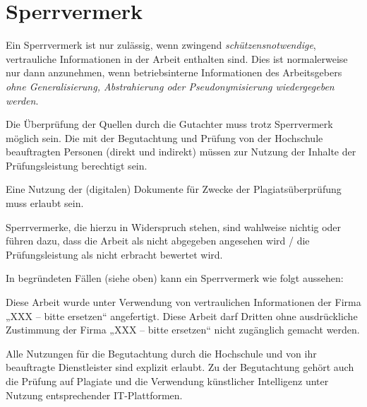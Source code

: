 %
%
\section*{Sperrvermerk}

Ein Sperrvermerk ist nur zulässig, wenn zwingend \emph{schützensnotwendige}, vertrauliche Informationen in der Arbeit enthalten sind. Dies ist normalerweise nur dann anzunehmen, wenn betriebsinterne Informationen des Arbeitsgebers \emph{ohne Generalisierung, Abstrahierung oder Pseudonymisierung wiedergegeben werden}.

Die Überprüfung der Quellen durch die Gutachter muss trotz Sperrvermerk möglich sein. Die mit der Begutachtung und Prüfung von der Hochschule beauftragten Personen (direkt und indirekt) müssen zur Nutzung der Inhalte der Prüfungsleistung berechtigt sein.

Eine Nutzung der (digitalen) Dokumente für Zwecke der Plagiatsüberprüfung muss erlaubt sein.

Sperrvermerke, die hierzu in Widerspruch stehen, sind wahlweise nichtig oder führen dazu, dass die Arbeit als nicht abgegeben angesehen wird / die Prüfungs\-leistung als nicht erbracht bewertet wird.

In begründeten Fällen (siehe oben) kann ein Sperrvermerk wie folgt aussehen:

Diese Arbeit wurde unter Verwendung von vertraulichen Informationen der Firma „XXX – bitte ersetzen“ angefertigt. Diese Arbeit darf Dritten ohne ausdrückliche Zustimmung der Firma „XXX – bitte ersetzen“ nicht zugänglich gemacht werden. 

Alle Nutzungen für die Begutachtung durch die Hochschule und von ihr beauftragte Dienstleister sind explizit erlaubt. Zu der Begutachtung gehört auch die Prüfung auf Plagiate und die Verwendung künstlicher Intelligenz unter Nutzung entsprechender IT-Plattformen.
